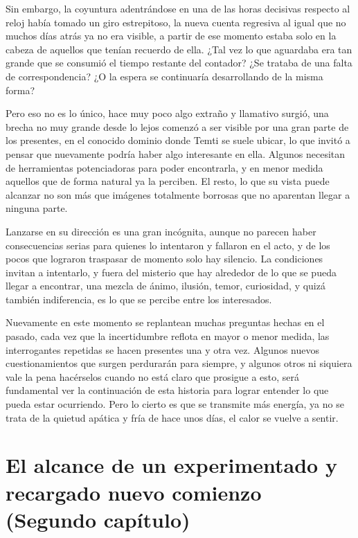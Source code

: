 \documentclass[
  spanish,
]{book}
\begin{document}
Sin embargo, la coyuntura adentrándose en una de las horas decisivas respecto al reloj había tomado un giro estrepitoso, la nueva cuenta regresiva al igual que no muchos días atrás ya no era visible, a partir de ese momento estaba solo en la cabeza de aquellos que tenían recuerdo de ella. ¿Tal vez lo que aguardaba era tan grande que se consumió el tiempo restante del contador? ¿Se trataba de una falta de correspondencia? ¿O la espera se continuaría desarrollando de la misma forma?

Pero eso no es lo único, hace muy poco algo extraño y llamativo surgió, una brecha no muy grande desde lo lejos comenzó a ser visible por una gran parte de los presentes, en el conocido dominio donde Temti se suele ubicar, lo que invitó a pensar que nuevamente podría haber algo interesante en ella. Algunos necesitan de herramientas potenciadoras para poder encontrarla, y en menor medida aquellos que de forma natural ya la perciben. El resto, lo que su vista puede alcanzar no son más que imágenes totalmente borrosas que no aparentan llegar a ninguna parte.

Lanzarse en su dirección es una gran incógnita, aunque no parecen haber consecuencias serias para quienes lo intentaron y fallaron en el acto, y de los pocos que lograron traspasar de momento solo hay silencio. La condiciones invitan a intentarlo, y fuera del misterio que hay alrededor de lo que se pueda llegar a encontrar, una mezcla de ánimo, ilusión, temor, curiosidad, y quizá también indiferencia, es lo que se percibe entre los interesados.

Nuevamente en este momento se replantean muchas preguntas hechas en el pasado, cada vez que la incertidumbre reflota en mayor o menor medida, las interrogantes repetidas se hacen presentes una y otra vez. Algunos nuevos cuestionamientos que surgen perdurarán para siempre, y algunos otros ni siquiera vale la pena hacérselos cuando no está claro que prosigue a esto, será fundamental ver la continuación de esta historia para lograr entender lo que pueda estar ocurriendo. Pero lo cierto es que se transmite más energía, ya no se trata de la quietud apática y fría de hace unos días, el calor se vuelve a sentir.

\hypertarget{el-alcance-de-un-experimentado-y-recargado-nuevo-comienzo-segundo-capuxedtulo}{%
\chapter{El alcance de un experimentado y recargado nuevo comienzo (Segundo capítulo)}\label{el-alcance-de-un-experimentado-y-recargado-nuevo-comienzo-segundo-capuxedtulo}}
\end{document}
